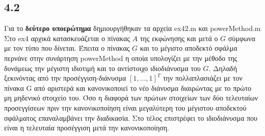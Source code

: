 \documentclass[a4paper,11pt]{article}
\begin{document}
\begin{flushleft}
\subsection*{4.2}
Για το \textbf{δεύτερο υποερώτημα} δημιουργήθηκαν τα αρχεία ex42.m και powerMethod.m
\newline
Στο ex4 αρχικά κατασκευάζεται ο πίνακας $A$ της εκφώνησης και μετά ο $G$ σύμφωνα με τον τύπο που δίνεται. Έπειτα ο πίνακας $G$ και το μέγιστο αποδεκτό σφάλμα περνάνε στην συνάρτηση powerMethod η οποία υπολογίζει με την μέθοδο της δυνάμεως την μέγιστη ιδιοτιμή και το αντίστοιχο ιδιοδιάνυσμα του $G$.
\newline
Δηλαδή ξεκινόντας από την προσέγγιση-διάνυσμα $[1,\dots,1]^T$ την πολλαπλασιάζει με τον πίνακα G από αριστερά και κανονικοποιεί το νέο διάνυσμα διαιρώντας με το πρώτο μη μηδενικό στοιχείο του. Όσο η διαφορά των πρώτων στοιχείων των δύο τελευταίων προσεγγίσεων πριν την κανονικοποίηση είναι μεγαλύτερη του μέγιστου αποδεκτού σφάλματος επαναλαμβάνει την διαδικασία.\newline
Στο τέλος επιστρέφει το ιδιοδιάνυσμα που είναι η τελευταία προσέγγιση μετά την κανονικοποίηση.\newline


\end{flushleft}
\end{document}
